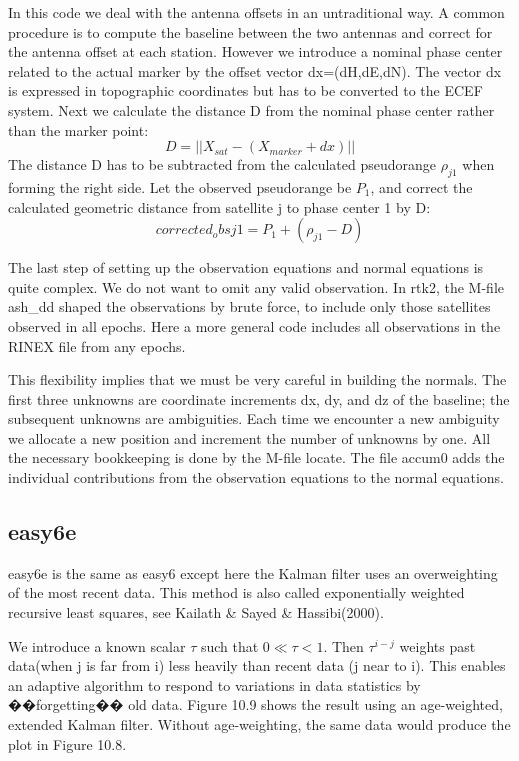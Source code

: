 In this code we deal with the antenna offsets in an untraditional way. A common procedure is to compute the baseline between the two antennas and correct for the antenna offset at each station. However we introduce a nominal phase center related to the actual marker by the offset vector dx=(dH,dE,dN). The vector dx is expressed in topographic coordinates but has to be converted to the ECEF system. Next we calculate the distance D from the nominal phase center rather than the marker point:
$$
D=||X_{sat}-(X_{marker}+dx)||
$$
The distance D has to be subtracted from the calculated pseudorange $\rho_{j1}$ when forming the right side. Let the observed pseudorange be $P_{1}$, and correct the calculated geometric distance from satellite j to phase center 1 by D:
$$
corrected_obsj1=P_{1}+(\rho_{j1}-D)
$$

The last step of setting up the observation equations and normal equations is quite complex. We do not want to omit any valid observation. In rtk2, the M-file ash\_dd shaped the observations by brute force, to include only those satellites observed in all epochs. Here a more general code includes all observations in the RINEX file from any epochs.

This flexibility implies that we must be very careful in building the normals. The first
three unknowns are coordinate increments dx, dy, and dz of the baseline; the subsequent unknowns are ambiguities. Each time we encounter a new ambiguity we allocate a new position and increment the number of unknowns by one. All the necessary bookkeeping is done by the M-file locate. The file accum0 adds the individual contributions from the observation equations to the normal equations.

\subsection{easy6e}

easy6e is the same as easy6 except here the Kalman filter uses an overweighting of the most recent data. This method is also called exponentially weighted recursive least squares, see Kailath \& Sayed \& Hassibi(2000).

We introduce a known scalar $\tau$ such that $0\ll \tau<1$. Then $\tau^{i-j}$ weights past data(when j is far from i) less heavily than recent data (j near to i). This enables an adaptive algorithm to respond to variations in data statistics by ��forgetting�� old data. Figure 10.9 shows the result using an age-weighted, extended Kalman filter. Without age-weighting, the same data would produce the plot in Figure 10.8.

